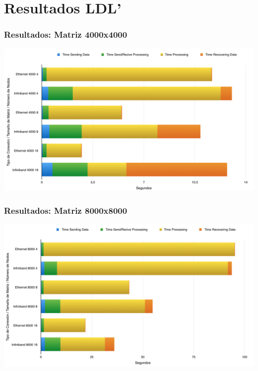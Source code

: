 \documentclass[10pt]{beamer}
\begin{document}
\section{Resultados LDL'}
\begin{frame}[fragile]
\frametitle{Resultados: Matriz 4000x4000}
\begin{center}
\includegraphics[scale=0.32]{4000.png}
\end{center}
\end{frame}
\begin{frame}[fragile]
\frametitle{Resultados: Matriz 8000x8000}
\begin{center}
\includegraphics[scale=0.32]{8000.png}
\end{center}
\end{frame}
\end{document}
